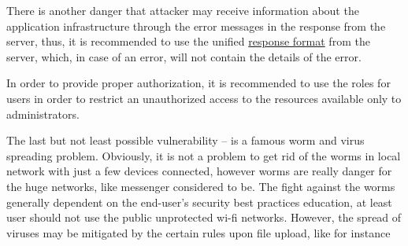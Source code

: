 There is another danger that attacker may receive information about the application infrastructure through the error messages in the
response from the server, thus, it is recommended to use the unified \href{https://datatracker.ietf.org/doc/html/rfc7231}{response format}
from the server, which, in case of an error, will not contain the details of the error.

In order to provide proper authorization, it is recommended to use the roles for users in order to restrict an unauthorized
access to the resources available only to administrators.

The last but not least possible vulnerability -- is a famous worm and virus spreading problem.
Obviously, it is not a problem to get rid of the worms in local network with just a few devices connected,
however worms are really danger for the huge networks, like messenger considered to be.
The fight against the worms generally dependent on the end-user's security best practices education, at least user should
not use the public unprotected wi-fi networks.
However, the spread of viruses may be mitigated by the certain rules upon file upload, like for instance


